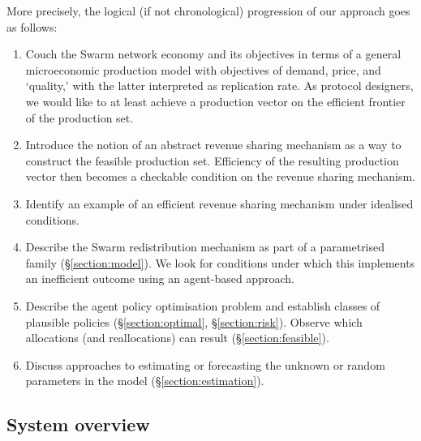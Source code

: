 More precisely, the logical (if not chronological) progression of our approach goes as follows:
\begin{enumerate}

  \item 
    Couch the Swarm network economy and its objectives in terms of a general microeconomic production model with objectives of demand, price, and `quality,' with the latter interpreted as replication rate.
    As protocol designers, we would like to at least achieve a production vector on the efficient frontier of the production set.
  
  \item
    Introduce the notion of an abstract revenue sharing mechanism as a way to construct the feasible production set.
    Efficiency of the resulting production vector then becomes a checkable condition on the revenue sharing mechanism.

  \item
    Identify an example of an efficient revenue sharing mechanism under idealised conditions.

  \item
    Describe the Swarm redistribution mechanism as part of a parametrised family (\S\ref{section:model}).
    We look for conditions under which this implements an inefficient outcome using an agent-based approach.

  \item
    Describe the agent policy optimisation problem and establish classes of plausible policies (\S\ref{section:optimal}, \S\ref{section:risk}).
    Observe which allocations (and reallocations) can result (\S\ref{section:feasible}).

  \item
    Discuss approaches to estimating or forecasting the unknown or random parameters in the model (\S\ref{section:estimation}).

\end{enumerate}

\subsection{System overview}

